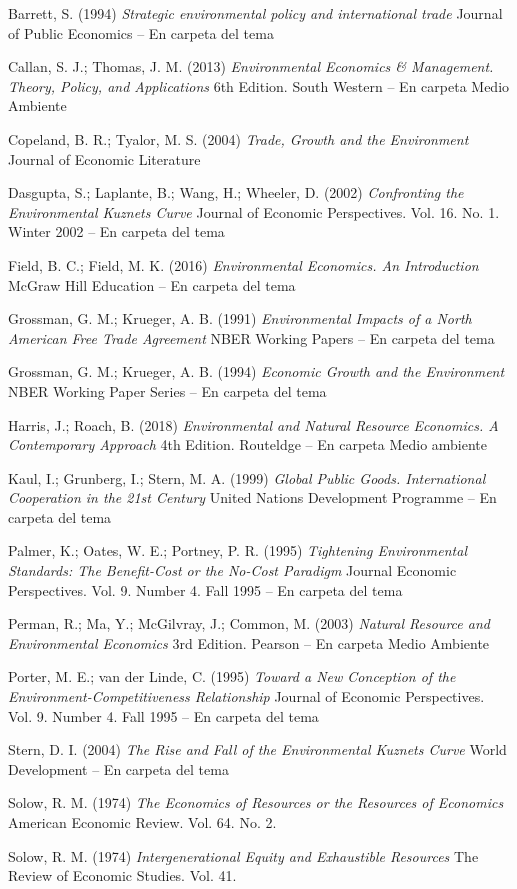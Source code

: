 \documentclass{nuevotema}
\begin{document}
Barrett, S. (1994) \textit{Strategic environmental policy and international trade} Journal of Public Economics -- En carpeta del tema

Callan, S. J.; Thomas, J. M. (2013) \textit{Environmental Economics \& Management. Theory, Policy, and Applications} 6th Edition. South Western -- En carpeta Medio Ambiente

Copeland, B. R.; Tyalor, M. S. (2004) \textit{Trade, Growth and the Environment} Journal of Economic Literature

Dasgupta, S.; Laplante, B.; Wang, H.; Wheeler, D. (2002) \textit{Confronting the Environmental Kuznets Curve} Journal of Economic Perspectives. Vol. 16. No. 1. Winter 2002 -- En carpeta del tema

Field, B. C.; Field, M. K. (2016) \textit{Environmental Economics. An Introduction} McGraw Hill Education -- En carpeta del tema

Grossman, G. M.; Krueger, A. B. (1991) \textit{Environmental Impacts of a North American Free Trade Agreement} NBER Working Papers -- En carpeta del tema

Grossman, G. M.; Krueger, A. B. (1994) \textit{Economic Growth and the Environment} NBER Working Paper Series -- En carpeta del tema

Harris, J.; Roach, B. (2018) \textit{Environmental and Natural Resource Economics. A Contemporary Approach} 4th Edition. Routeldge -- En carpeta Medio ambiente

Kaul, I.; Grunberg, I.; Stern, M. A. (1999) \textit{Global Public Goods. International Cooperation in the 21st Century} United Nations Development Programme -- En carpeta del tema 

Palmer, K.; Oates, W. E.; Portney, P. R. (1995) \textit{Tightening Environmental Standards: The Benefit-Cost or the No-Cost Paradigm} Journal Economic Perspectives. Vol. 9. Number 4. Fall 1995 -- En carpeta del tema

Perman, R.; Ma, Y.; McGilvray, J.; Common, M. (2003) \textit{Natural Resource and Environmental Economics} 3rd Edition. Pearson -- En carpeta Medio Ambiente

Porter, M. E.; van der Linde, C. (1995) \textit{Toward a New Conception of the Environment-Competitiveness Relationship} Journal of Economic Perspectives. Vol. 9. Number 4. Fall 1995 -- En carpeta del tema

Stern, D. I. (2004) \textit{The Rise and Fall of the Environmental Kuznets Curve} World Development -- En carpeta del tema

Solow, R. M. (1974) \textit{The Economics of Resources or the Resources of Economics} American Economic Review. Vol. 64. No. 2. 

Solow, R. M. (1974) \textit{Intergenerational Equity and Exhaustible Resources} The Review of Economic Studies. Vol. 41.
\end{document}
